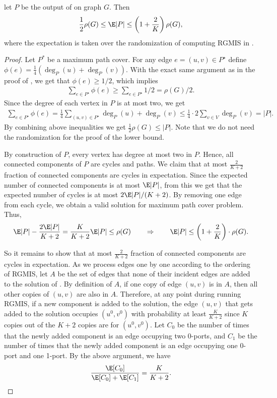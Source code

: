 \begin{lemma}\label{clm: approximation-bound}
let $P$ be the output of \algtwo{} on graph $G$. Then
$$
    \frac{1}{2} \rho(G) \leq \E|P| \leq \left(1+\frac{2}{K}\right) \rho(G),
$$
where the expectation is taken over the randomization of computing RGMIS in \algtwo{}.
\end{lemma}
\begin{proof}
    Let $P^*$ be a maximum path cover. For any edge $e=(u, v) \in P^\star$ define $\phi(e) = \frac{1}{4}(\deg_P(u) + \deg_P(v))$. With the exact same argument as in the proof of , we get that $\phi(e) \geq 1/2$, which implies
    \begin{align*}
        \sum_{e \in P^\star} \phi(e) \geq \sum_{e \in P^\star} 1/2 = \rho(G)/2.
    \end{align*}
    Since the degree of each vertex in $P$ is at most two, we get
    \begin{align*}
        \sum_{e \in P^\star} \phi(e) = \frac{1}{4} \sum_{(u, v) \in P^\star} \deg_P(u)+\deg_P(v) \leq \frac{1}{4} \cdot 2 \sum_{v \in V} \deg_P(v) = |P|.
    \end{align*}
    By combining above inequalities we get $ \frac{1}{2} \rho(G) \leq |P|$. Note that we do not need the randomization for the proof of the lower bound.
    
    By construction of $P$, every vertex has degree at most two in $P$. Hence, all connected components of $P$ are cycles and paths. We claim that at most $\frac{2}{K+2}$ fraction of connected components are cycles in expectation. Since the expected number of connected components is at most $\E|P|$, from this we get that the expected number of cycles is at most $2\E|P|/(K+2)$. By removing one edge from each cycle, we obtain a valid solution for maximum path cover problem. Thus,
    \begin{align*}
        \E|P| - \frac{2\E|P|}{K + 2} = \frac{K}{K+2} \E|P| \leq \rho(G) \qquad \Rightarrow \qquad \E|P| \leq \left(1+ \frac{2}{K}\right)\cdot\rho(G).
    \end{align*}
   
    So it remains to show that at most $\frac{2}{K+2}$ fraction of connected components are cycles in expectation. As we process edges one by one according to the ordering of RGMIS, let $A$ be the set of edges that none of their incident edges are added to the solution of \algtwo{}. By definition of $A$, if one copy of edge $(u, v)$ is in $A$, then all other copies of $(u,v)$ are also in $A$. Therefore, at any point during running RGMIS, if a new component is added to the solution, the edge $(u,v)$ that gets added to the solution occupies $(u^0, v^0)$ with probability at least $\frac{K}{K+2}$ since $K$ copies out of the $K+2$ copies are for $(u^0, v^0)$. Let $C_0$ be the number of times that the newly added component is an edge occupying two 0-ports, and $C_1$ be the number of times that the newly added component is an edge occupying one 0-port and one 1-port. By the above argument, we have
    \begin{align}\label{eq:cycle-ineq}
        \frac{\E[C_0]}{\E[C_0] + \E[C_1]} = \frac{K}{K+2}.
    \end{align}
    

\end{proof}
